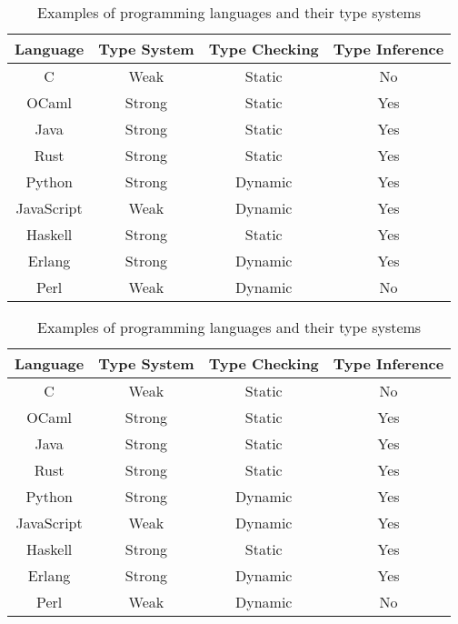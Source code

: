 \begin{table}[t]
    \setlength\arrayrulewidth{1pt}
    \setlength\arrayrulewidth{1pt}
    \centering
    \begin{tabular}{|c|c|c|c|}
        \hline
        \textbf{Language} & \textbf{Type System} & \textbf{Type Checking} & \textbf{Type Inference} \\
        \hline
        C & Weak & Static & No \\
        OCaml & Strong & Static & Yes \\
        Java & Strong & Static  & Yes \\
        Rust & Strong & Static  & Yes \\
        Python & Strong & Dynamic  & Yes \\
        JavaScript & Weak & Dynamic  & Yes \\
        Haskell & Strong & Static  & Yes \\
        Erlang & Strong & Dynamic  & Yes \\
        Perl & Weak & Dynamic  & No \\
        \hline
    \end{tabular}
    \caption{Examples of programming languages and their type systems}
    \label{tab:TypeSystems}
\end{table}

\begin{table}[t]
    \centering
    \begin{tabular}{ c c c c }
        \\\toprule \textbf{Language} & \textbf{Type System} & \textbf{Type Checking} & \textbf{Type Inference} \\
        \midrule
        C & Weak & Static & No \\
        OCaml & Strong & Static & Yes \\
        Java & Strong & Static  & Yes \\
        Rust & Strong & Static  & Yes \\
        Python & Strong & Dynamic  & Yes \\
        JavaScript & Weak & Dynamic  & Yes \\
        Haskell & Strong & Static  & Yes \\
        Erlang & Strong & Dynamic  & Yes \\
        Perl & Weak & Dynamic  & No \\
        \bottomrule
    \end{tabular}
    \caption{Examples of programming languages and their type systems}
    \label{tab:TypeSystems}
\end{table}


